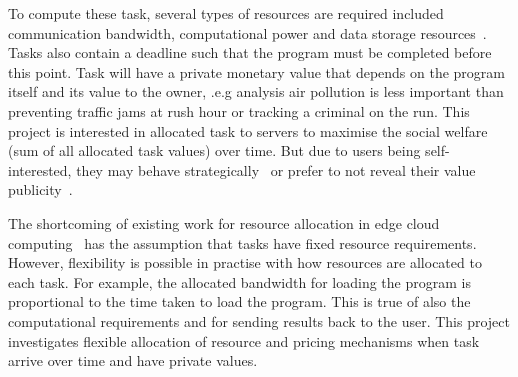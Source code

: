 To compute these task, several types of resources are required included communication bandwidth, computational power
and data storage resources~\citep{vaji_infocom}. Tasks also contain a deadline such that the program must be completed
before this point. Task will have a private monetary value that depends on the program itself and its value to the owner,
.e.g analysis air pollution is less important than preventing traffic jams at rush hour or tracking a criminal on the
run. This project is interested in allocated task to servers to maximise the social welfare (sum of all allocated
task values) over time. But due to users being self-interested, they may behave strategically~\citep{Bi2019} or prefer
to not reveal their value publicity~\citep{Pai2013}.

The shortcoming of existing work for resource allocation in edge cloud computing~\citep{vaji_infocom, Bi2019}
has the assumption that tasks have fixed resource requirements. However, flexibility is possible in practise
with how resources are allocated to each task. For example, the allocated bandwidth for loading the program is
proportional to the time taken to load the program. This is true of also the computational requirements and
for sending results back to the user. This project investigates flexible allocation of resource and pricing
mechanisms when task arrive over time and have private values.
